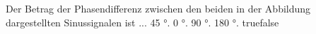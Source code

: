     {Der Betrag der Phasendifferenz zwischen den beiden in der Abbildung dargestellten Sinussignalen ist ...}
    {45 °. }
    {0 °.}
    {90 °.}
    {180 °.}
    {true}{false}